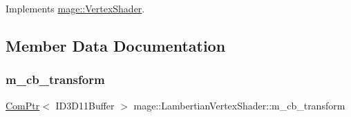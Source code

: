 Implements \hyperlink{classmage_1_1_vertex_shader_a095834b90967611e69205e9e82f4a536}{mage\+::\+Vertex\+Shader}.



\subsection{Member Data Documentation}
\hypertarget{classmage_1_1_lambertian_vertex_shader_aae0f2411821315d89eeb982e6c30c22e}{}\label{classmage_1_1_lambertian_vertex_shader_aae0f2411821315d89eeb982e6c30c22e} 
\subsubsection{\texorpdfstring{m\+\_\+cb\+\_\+transform}{m\_cb\_transform}}
{\footnotesize\ttfamily \hyperlink{namespacemage_ae74f374780900893caa5555d1031fd79}{Com\+Ptr}$<$ I\+D3\+D11\+Buffer $>$ mage\+::\+Lambertian\+Vertex\+Shader\+::m\+\_\+cb\+\_\+transform\hspace{0.3cm}{\ttfamily [private]}}

